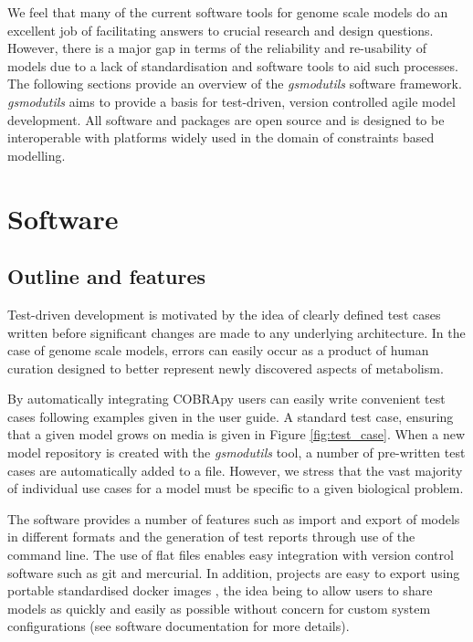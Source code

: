 \documentclass[journal=asbcd6]{achemso}
\begin{document}
We feel that many of the current software tools for genome scale models do an excellent job of facilitating answers to crucial research and design questions.
However, there is a major gap in terms of the reliability and re-usability of models due to a lack of standardisation and software tools to aid such processes.
The following sections provide an overview of the \textit{gsmodutils} software framework.
\textit{gsmodutils} aims to provide a basis for test-driven, version controlled agile model development.
All software and packages are open source and is designed to be interoperable with platforms widely used in the domain of constraints based modelling.

\section{Software}

\subsection{Outline and features}
Test-driven development is motivated by the idea of clearly defined test cases written before significant changes are made to any underlying architecture.
In the case of genome scale models, errors can easily occur as a product of human curation designed to better represent newly discovered aspects of metabolism.

By automatically integrating COBRApy \cite{ebrahim2013cobrapy} users can easily write convenient test cases following examples given in the user guide.
A standard test case, ensuring that a given model grows on media is given in Figure \ref{fig:test_case}.
When a new model repository is created with the \textit{gsmodutils} tool, a number of pre-written test cases are automatically added to a file.
However, we stress that the vast majority of individual use cases for a model must be specific to a given biological problem.

The software provides a number of features such as import and export of models in different formats and the generation of test reports through use of the command line. 
The use of flat files enables easy integration with version control software such as git and mercurial.
In addition, projects are easy to export using portable standardised docker images \cite{merkel2014docker}, the idea being to allow users to share models as quickly and easily as possible without concern for custom system configurations (see software documentation for more details).
\end{document}

